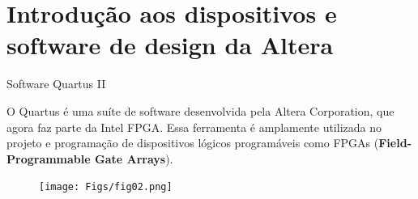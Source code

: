 \documentclass{CPSPresentation}
\begin{document}
\section{Introdução aos dispositivos e software de design da Altera}

\begin{frame}{Software Quartus II}
	
\begin{block}{}
	\justifying
	O Quartus é uma suíte de software desenvolvida pela Altera Corporation, que agora faz parte da Intel FPGA. Essa ferramenta é amplamente utilizada no projeto e programação de dispositivos lógicos programáveis como FPGAs (\textbf{Field-Programmable Gate Arrays}).
	
\end{block}	
	
	
	\begin{figure}[h]
		\centering
		\texttt{[image: Figs/fig02.png]}
	\end{figure}
	
\end{frame}
\end{document}
